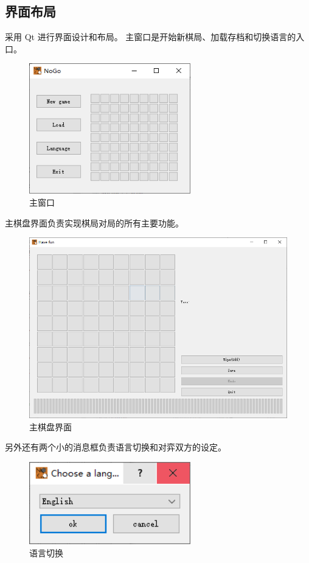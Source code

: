 \documentclass[UTF-8]{ctexart}
\begin{document}
		\subsection{界面布局}
			采用 Qt 进行界面设计和布局。
			主窗口是开始新棋局、加载存档和切换语言的入口。
			\begin{figure}[H]
				\centering
				\includegraphics[width=7cm]{./file/mainw.png}
				\caption{主窗口}
			\end{figure}
			主棋盘界面负责实现棋局对局的所有主要功能。
			\begin{figure}[H]
				\centering
				\includegraphics[width=13cm]{./file/playw.png}
				\caption{主棋盘界面}
			\end{figure}
			另外还有两个小的消息框负责语言切换和对弈双方的设定。
			\begin{figure}[H]
				\centering
				\includegraphics[width=7cm]{./file/language.png}
				\caption{语言切换}
			\end{figure}
\end{document}

